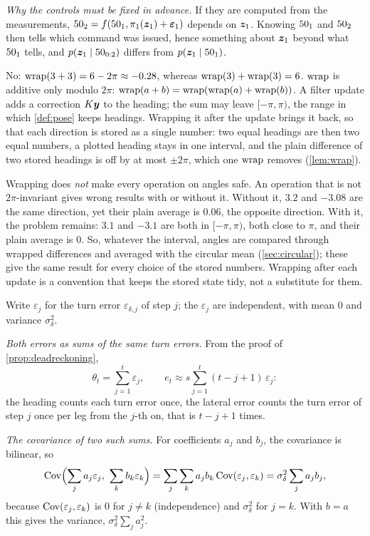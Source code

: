 \emph{Why the controls must be fixed in advance.} If they are computed
from the measurements, $50_2=f(50_1,\pi_1(\bm{z}_1)+\bm{\varepsilon}_1)$ depends on
$\bm{z}_1$. Knowing $50_1$ and $50_2$ then tells which command was issued,
hence something about $\bm{z}_1$ beyond what $50_1$ tells, and
$p(\bm{z}_1\mid50_{0:2})$ differs from $p(\bm{z}_1\mid50_1)$.

 No: $\operatorname{wrap}(3+3)=6-2\pi\approx-0.28$, whereas
$\operatorname{wrap}(3)+\operatorname{wrap}(3)=6$. $\operatorname{wrap}$ is additive only modulo $2\pi$:
$\operatorname{wrap}(a+b)=\operatorname{wrap}(\operatorname{wrap}(a)+\operatorname{wrap}(b))$. A filter update adds a correction
$K\bm{y}$ to the heading; the sum may leave $[-\pi,\pi)$, the range in which
\cref{def:pose} keeps headings. Wrapping it after the update brings it
back, so that each direction is stored as a single number: two equal
headings are then two equal numbers, a plotted heading stays in one
interval, and the plain difference of two stored headings is off by at
most $\pm2\pi$, which one $\operatorname{wrap}$ removes (\cref{lem:wrap}).

Wrapping does \emph{not} make every operation on angles safe. An
operation that is not $2\pi$-invariant gives wrong results with or
without it. Without it, $3.2$ and $-3.08$ are the same direction, yet
their plain average is $0.06$, the opposite direction. With it, the
problem remains: $3.1$ and $-3.1$ are both in $[-\pi,\pi)$, both close to
$\pi$, and their plain average is $0$. So, whatever the interval, angles
are compared through wrapped differences and averaged with the circular
mean (\cref{sec:circular}); these give the same result for every choice
of the stored numbers. Wrapping after each update is a convention that
keeps the stored state tidy, not a substitute for them.

 Write $\varepsilon_j$ for the turn error
$\varepsilon_{\delta,j}$ of step $j$; the $\varepsilon_j$ are independent,
with mean $0$ and variance $\sigma_\delta^2$.

\emph{Both errors as sums of the same turn errors.} From the proof of
\cref{prop:deadreckoning},
\[
  \theta_t=\sum_{j=1}^t\varepsilon_j,
  \qquad
  e_t\approx s\sum_{j=1}^t(t-j+1)\,\varepsilon_j :
\]
the heading counts each turn error once, the lateral error counts the
turn error of step $j$ once per leg from the $j$-th on, that is $t-j+1$
times.

\emph{The covariance of two such sums.} For coefficients $a_j$ and $b_j$,
the covariance is bilinear, so
\[
  \Cov\Bigl(\sum_ja_j\varepsilon_j,\ \sum_kb_k\varepsilon_k\Bigr)
  =\sum_j\sum_ka_jb_k\Cov(\varepsilon_j,\varepsilon_k)
  =\sigma_\delta^2\sum_ja_jb_j ,
\]
because $\operatorname{Cov}(\varepsilon_j,\varepsilon_k)$ is $0$ for $j\neq k$
(independence) and $\sigma_\delta^2$ for $j=k$. With $b=a$ this gives the
variance, $\sigma_\delta^2\sum_ja_j^2$.

